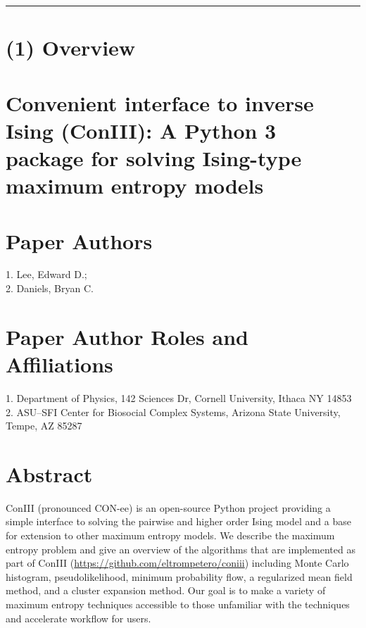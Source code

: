 \documentclass{jors}
\begin{document}
\newcommand{\mr}[1]{\mathrm{#1}}
\newcommand{\mb}[1]{\mathbf{#1}}
\newcommand{\br}[1]{\left<#1\right>}
\newcommand{\bl}[1]{\left|#1\right|}
\newcommand{\mc}[1]{\mathcal{#1}}
\newcommand{\tb}[1]{\textcolor{blue}{#1}}
\newcommand{\tr}[1]{\textcolor{red}{#1}}
\newcommand{\tg}[1]{\textcolor{green}{#1}}
\newcommand{\si}[0]{{\rm s}_{\rm i}}
\newcommand{\sj}[0]{{\rm s}_{\rm j}}
\newcommand{\bs}[1]{\boldsymbol{#1}}
\newcommand{\rs}[0]{{\rm s}}
\newcommand{\rk}[0]{{\rm k}}

\rule{\textwidth}{1pt}

\section*{(1) Overview}
\vspace{0.5cm}

\section*{Convenient interface to inverse Ising (ConIII): A Python 3 package for solving Ising-type maximum entropy models}

\section*{Paper Authors}
1. Lee, Edward D.; \\
2. Daniels, Bryan C.

\section*{Paper Author Roles and Affiliations}
1. Department of Physics, 142 Sciences Dr, Cornell University, Ithaca NY 14853 \\
2. ASU--SFI Center for Biosocial Complex Systems, Arizona State University, Tempe, AZ 85287

\section*{Abstract}

ConIII (pronounced CON-ee) is an open-source Python project providing a simple interface to solving the pairwise and higher order Ising model and a base for extension to other maximum entropy models. We describe the maximum entropy problem and give an overview of the algorithms that are implemented as part of ConIII (\url{https://github.com/eltrompetero/coniii}) including Monte Carlo histogram, pseudolikelihood,  minimum probability flow, a regularized mean field method, and a cluster expansion method. Our goal is to make a variety of maximum entropy techniques accessible to those unfamiliar with the techniques and accelerate workflow for users.
\end{document}
